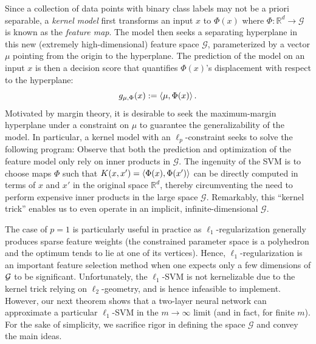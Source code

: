 Since a collection of data points with binary class labels may not be a priori separable, a \textit{kernel model} first transforms an input $x$ to $\Phi(x)$ where $\Phi: \mathbb{R}^d \to \mathcal{G}$ is known as the \textit{feature map}. The model then seeks a separating hyperplane in this new (extremely high-dimensional) feature space $\mathcal{G}$, parameterized by a vector $\mu$ pointing from the origin to the hyperplane. The prediction of the model on an input $x$ is then a decision score that quantifies $\Phi(x)$'s displacement with respect to the hyperplane:
\begin{equation}
g_{\mu, \Phi}(x) := \left\langle \mu, \Phi(x) \right\rangle.
\end{equation}
Motivated by margin theory, it is desirable to seek the maximum-margin hyperplane under a constraint on $\mu$ to guarantee the generalizability of the model. In particular, a kernel model with an $\ell_p$-constraint seeks to solve the following program:
Observe that both the prediction and optimization of the feature model only rely on inner products in $\mathcal{G}$. The ingenuity of the SVM is to choose maps $\Phi$ such that $K(x, x') = \left\langle \Phi(x), \Phi(x') \right\rangle$ can be directly computed in terms of $x$ and $x'$ in the original space $\mathbb{R}^d$, thereby circumventing the need to perform expensive inner products in the large space $\mathcal{G}$. Remarkably, this ``kernel trick'' enables us to even operate in an implicit, infinite-dimensional $\mathcal{G}$. 

The case of $p=1$ is particularly useful in practice as $\ell_1$-regularization generally produces sparse feature weights (the constrained parameter space is a polyhedron and the optimum tends to lie at one of its vertices). Hence, $\ell_1$-regularization is an important feature selection method when one expects only a few dimensions of $\mathcal G$ to be significant. Unfortunately, the $\ell_1$-SVM is not kernelizable due to the kernel trick relying on $\ell_2$-geometry, and is hence infeasible to implement. However, our next theorem shows that a two-layer neural network can approximate a particular $\ell_1$-SVM in the $m \to \infty$ limit (and in fact, for finite $m$). For the sake of simplicity, we sacrifice rigor in defining the space $\mathcal{G}$ and convey the main ideas.

